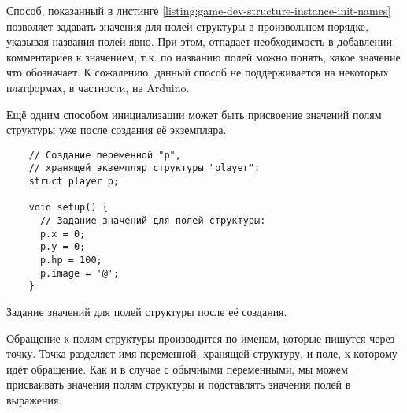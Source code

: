 \documentclass[../sparc.tex]{subfiles}
\begin{document}
Способ, показанный в листинге
\ref{listing:game-dev-structure-instance-init-names} позволяет задавать значения
для полей структуры в произвольном порядке, указывая названия полей явно.  При
этом, отпадает необходимость в добавлении комментариев к значением, т.к. по
названию полей можно понять, какое значение что обозначает.  К сожалению, данный
способ не поддерживается на некоторых платформах, в частности, на Arduino.

Ещё одним способом инициализации может быть присвоение значений полям структуры
уже после создания её экземпляра.

\begin{listing}[H]
  \begin{verbatim}
    // Создание переменной "p",
    // хранящей экземпляр структуры "player":
    struct player p;

    void setup() {
      // Задание значений для полей структуры:
      p.x = 0;
      p.y = 0;
      p.hp = 100;
      p.image = '@';
    }
  \end{verbatim}
  \caption{Задание значений для полей структуры после её создания.}
  \label{listing:game-dev-structure-assignment}
\end{listing}

Обращение к полям структуры производится по именам, которые пишутся через точку.
Точка разделяет имя переменной, хранящей структуру, и поле, к которому идёт
обращение.  Как и в случае с обычными переменными, мы можем присваивать значения
полям структуры и подставлять значения полей в выражения.
\end{document}
